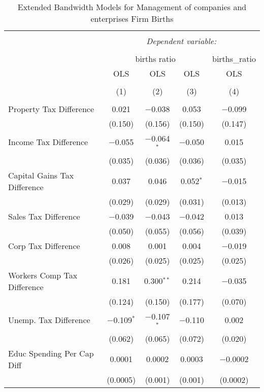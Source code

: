 
\begin{table}[!htbp] \centering 
  \caption{Extended Bandwidth Models for  Management of companies and enterprises Firm Births} 
  \label{55eb} 
\begin{tabular}{@{\extracolsep{5pt}}lcccc} 
\\[-1.8ex]\hline 
\hline \\[-1.8ex] 
 & \multicolumn{4}{c}{\textit{Dependent variable:}} \\ 
\cline{2-5} 
\\[-1.8ex] & \multicolumn{3}{c}{births ratio} & births\_ratio \\ 
 & OLS & OLS & OLS & OLS \\ 
\\[-1.8ex] & (1) & (2) & (3) & (4)\\ 
\hline \\[-1.8ex] 
 Property Tax Difference & 0.021 & $-$0.038 & 0.053 & $-$0.099 \\ 
  & (0.150) & (0.156) & (0.150) & (0.147) \\ 
  Income Tax Difference & $-$0.055 & $-$0.064$^{*}$ & $-$0.050 & 0.015 \\ 
  & (0.035) & (0.036) & (0.036) & (0.035) \\ 
  Capital Gains Tax Difference & 0.037 & 0.046 & 0.052$^{*}$ & $-$0.015 \\ 
  & (0.029) & (0.029) & (0.031) & (0.013) \\ 
  Sales Tax Difference & $-$0.039 & $-$0.043 & $-$0.042 & 0.013 \\ 
  & (0.050) & (0.055) & (0.056) & (0.039) \\ 
  Corp Tax Difference & 0.008 & 0.001 & 0.004 & $-$0.019 \\ 
  & (0.026) & (0.025) & (0.025) & (0.025) \\ 
  Workers Comp Tax Difference & 0.181 & 0.300$^{**}$ & 0.214 & $-$0.035 \\ 
  & (0.124) & (0.150) & (0.177) & (0.070) \\ 
  Unemp. Tax Difference & $-$0.109$^{*}$ & $-$0.107$^{*}$ & $-$0.110 & 0.002 \\ 
  & (0.062) & (0.065) & (0.072) & (0.020) \\ 
  Educ Spending Per Cap Diff & 0.0001 & 0.0002 & 0.0003 & $-$0.0002 \\ 
  & (0.0005) & (0.001) & (0.001) & (0.0002) \\ 

\end{tabular}
\end{table}
